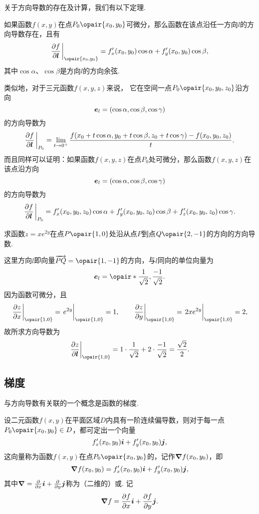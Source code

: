 关于方向导数的存在及计算，我们有以下定理.
\begin{theorem}[充分条件]
如果函数\(f(x,y)\)在点\(P_0\opair{x_0,y_0}\)可微分，那么函数在该点沿任一方向\(l\)的方向导数存在，且有\[
\pdv{f}{\mat{l}}\eval_{\opair{x_0,y_0}}
=f'_x(x_0,y_0) \cos\alpha + f'_y(x_0,y_0) \cos\beta,
\]其中\(\cos\alpha\)、\(\cos\beta\)是方向\(l\)的方向余弦.
\end{theorem}

类似地，对于三元函数\(f(x,y,z)\)来说，
它在空间一点\(P_0\opair{x_0,y_0,z_0}\)沿方向\[
	\boldsymbol{e}_l = (\cos\alpha,\cos\beta,\cos\gamma)
\]的方向导数为\[
	\pdv{f}{\mat{l}}\eval_{P_0}
	= \lim\limits_{t\to0^+}
	\frac{f(x_0+t\cos\alpha,y_0+t\cos\beta,z_0+t\cos\gamma)-f(x_0,y_0,z_0)}{t}.
\]
而且同样可以证明：如果函数\(f(x,y,z)\)在点\(P_0\)处可微分，那么函数\(f(x,y,z)\)在该点沿方向\[
	\boldsymbol{e}_l = (\cos\alpha,\cos\beta,\cos\gamma)
\]的方向导数为\[
\pdv{f}{\mat{l}}\eval_{P_0}
= f'_x(x_0,y_0,z_0) \cos\alpha + f'_y(x_0,y_0,z_0) \cos\beta + f'_z(x_0,y_0,z_0) \cos\gamma.
\]

\begin{example}
求函数\(z = x e^{2y}\)在点\(P\opair{1,0}\)处沿从点\(P\)到点\(Q\opair{2,-1}\)的方向的方向导数.
\begin{solution}
这里方向\(l\)即向量\(\vec{PQ} = \opair{1,-1}\)的方向，与\(l\)同向的单位向量为\[
\mat{e}_l = \opair*{\frac{1}{\sqrt{2}},\frac{-1}{\sqrt{2}}}.
\]因为函数可微分，且\[
\eval{\pdv{z}{x}}_{\opair{1,0}}
= \eval{e^{2y}}_{\opair{1,0}}
= 1,
\qquad
\eval{\pdv{z}{y}}_{\opair{1,0}}
= \eval{2xe^{2y}}_{\opair{1,0}}
= 2,
\]故所求方向导数为\[
\eval{\pdv{z}{\mat{l}}}_{\opair{1,0}}
= 1 \cdot \frac{1}{\sqrt{2}} + 2 \cdot \frac{-1}{\sqrt{2}}
= \frac{\sqrt{2}}{2}.
\]
\end{solution}
\end{example}

\subsection{梯度}
与方向导数有关联的一个概念是函数的梯度.
\begin{definition}
设二元函数\(f(x,y)\)在平面区域\(D\)内具有一阶连续偏导数，则对于每一点\(P_0\opair{x_0,y_0} \in D\)，都可定出一个向量\[
f'_x(x_0,y_0) \boldsymbol{i} + f'_y(x_0,y_0) \boldsymbol{j},
\]这向量称为函数\(f(x,y)\)在点\(P_0\opair{x_0,y_0}\)的，记作\(\grad{f}(x_0,y_0)\)，即\[
\grad{f}(x_0,y_0)
= f'_x(x_0,y_0) \boldsymbol{i} + f'_y(x_0,y_0) \boldsymbol{j},
\]其中\(\grad = \pdv{x} \boldsymbol{i} + \pdv{y} \boldsymbol{j}\)称为（二维的）或.
记\[
\grad{f} = \pdv{f}{x} \boldsymbol{i} + \pdv{f}{y} \boldsymbol{j}.
\]
\end{definition}

